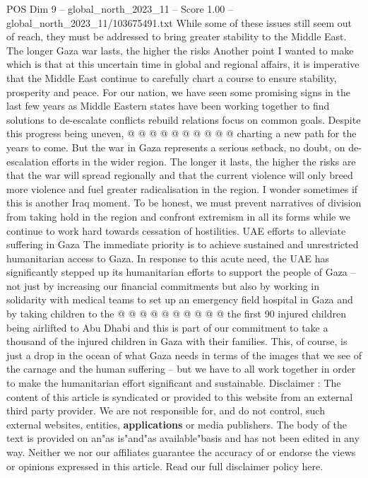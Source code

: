\begin{textsample}{POS Dim 9 – global\_north\_2023\_11 – Score 1.00 – global\_north\_2023\_11/103675491.txt}
While some of these issues still seem out of reach, they must be addressed to bring greater stability to the Middle East.
The longer Gaza war lasts, the higher the risks Another point I wanted to make which is that at this uncertain time in global and regional affairs, it is imperative that the Middle East continue to carefully chart a course to ensure stability, prosperity and peace.
For our nation, we have seen some promising signs in the last few years as Middle Eastern states have been working together to find solutions to de-escalate conflicts rebuild relations focus on common goals.
Despite this progress being uneven, @ @ @ @ @ @ @ @ @ @ charting a new path for the years to come.
But the war in Gaza represents a serious setback, no doubt, on de-escalation efforts in the wider region.
The longer it lasts, the higher the risks are that the war will spread regionally and that the current violence will only breed more violence and fuel greater radicalisation in the region.
I wonder sometimes if this is another Iraq moment.
To be honest, we must prevent narratives of division from taking hold in the region and confront extremism in all its forms while we continue to work hard towards cessation of hostilities.
UAE efforts to alleviate suffering in Gaza The immediate priority is to achieve sustained and unrestricted humanitarian access to Gaza.
In response to this acute need, the UAE has significantly stepped up its humanitarian efforts to support the people of Gaza -- not just by increasing our financial commitments but also by working in solidarity with medical teams to set up an emergency field hospital in Gaza and by taking children to the @ @ @ @ @ @ @ @ @ @ the first 90 injured children being airlifted to Abu Dhabi and this is part of our commitment to take a thousand of the injured children in Gaza with their families.
This, of course, is just a drop in the ocean of what Gaza needs in terms of the images that we see of the carnage and the human suffering -- but we have to all work together in order to make the humanitarian effort significant and sustainable.
Disclaimer : The content of this article is syndicated or provided to this website from an external third party provider.
We are not responsible for, and do not control, such external websites, entities, \textbf{applications} or media publishers.
The body of the text is provided on an"as is"and"as available"basis and has not been edited in any way.
Neither we nor our affiliates guarantee the accuracy of or endorse the views or opinions expressed in this article.
Read our full disclaimer policy here.

\end{textsample}
